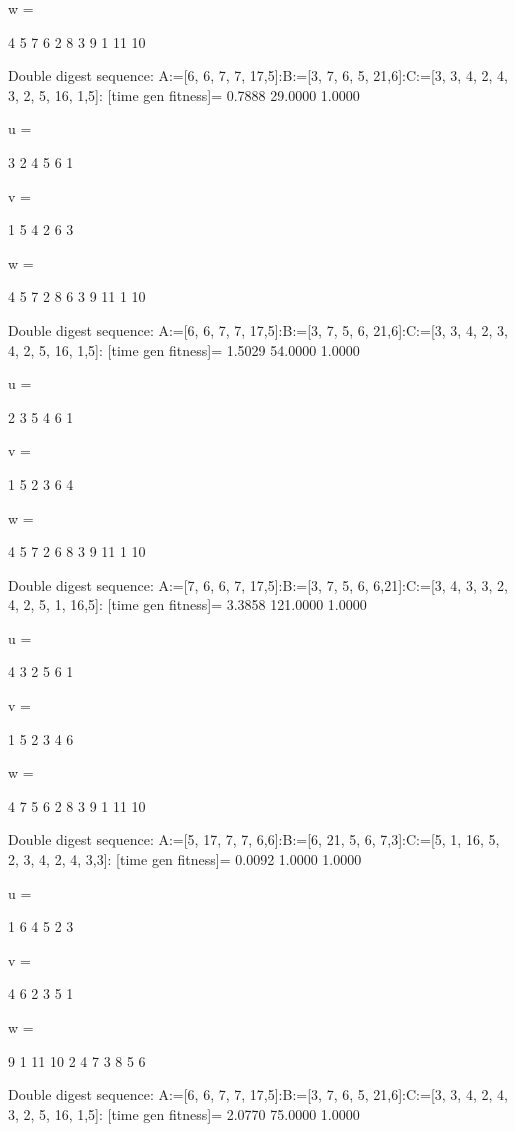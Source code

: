 w =

     4     5     7     6     2     8     3     9     1    11    10

Double digest sequence:
A:=[6, 6, 7, 7, 17,5]:B:=[3, 7, 6, 5, 21,6]:C:=[3, 3, 4, 2, 4, 3, 2, 5, 16, 1,5]:
[time gen fitness]=
    0.7888   29.0000    1.0000


u =

     3     2     4     5     6     1


v =

     1     5     4     2     6     3


w =

     4     5     7     2     8     6     3     9    11     1    10

Double digest sequence:
A:=[6, 6, 7, 7, 17,5]:B:=[3, 7, 5, 6, 21,6]:C:=[3, 3, 4, 2, 3, 4, 2, 5, 16, 1,5]:
[time gen fitness]=
    1.5029   54.0000    1.0000


u =

     2     3     5     4     6     1


v =

     1     5     2     3     6     4


w =

     4     5     7     2     6     8     3     9    11     1    10

Double digest sequence:
A:=[7, 6, 6, 7, 17,5]:B:=[3, 7, 5, 6, 6,21]:C:=[3, 4, 3, 3, 2, 4, 2, 5, 1, 16,5]:
[time gen fitness]=
    3.3858  121.0000    1.0000


u =

     4     3     2     5     6     1


v =

     1     5     2     3     4     6


w =

     4     7     5     6     2     8     3     9     1    11    10

Double digest sequence:
A:=[5, 17, 7, 7, 6,6]:B:=[6, 21, 5, 6, 7,3]:C:=[5, 1, 16, 5, 2, 3, 4, 2, 4, 3,3]:
[time gen fitness]=
    0.0092    1.0000    1.0000


u =

     1     6     4     5     2     3


v =

     4     6     2     3     5     1


w =

     9     1    11    10     2     4     7     3     8     5     6

Double digest sequence:
A:=[6, 6, 7, 7, 17,5]:B:=[3, 7, 6, 5, 21,6]:C:=[3, 3, 4, 2, 4, 3, 2, 5, 16, 1,5]:
[time gen fitness]=
    2.0770   75.0000    1.0000


